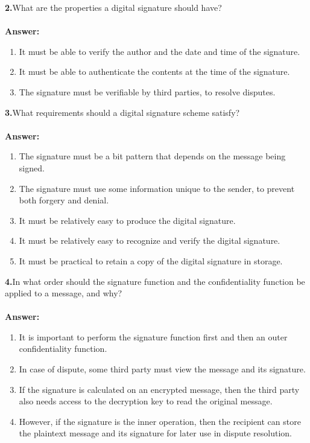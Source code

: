 \documentclass[paper=a4, fontsize=11pt]{scrartcl} %
\numberwithin{equation}{section} %
\numberwithin{figure}{section} %
\numberwithin{table}{section} %
\begin{document}
\textbf{2.}What are the properties a digital signature should have?
\\
\\
\textbf{Answer:}
\begin{enumerate}
\item It must be able to verify the author and the date and time of the signature.
\item It must be able to authenticate the contents at the time of the signature.
\item The signature must be verifiable by third parties, to resolve disputes.
\end{enumerate}

\textbf{3.}What requirements should a digital signature scheme satisfy?
\\
\\
\textbf{Answer:}
\begin{enumerate}
\item The signature must be a bit pattern that depends on the message being signed.
\item The signature must use some information unique to the sender, to prevent both forgery and denial.
\item It must be relatively easy to produce the digital signature.
\item It must be relatively easy to recognize and verify the digital signature.
\item It must be practical to retain a copy of the digital signature in storage.
\end{enumerate}

\textbf{4.}In what order should the signature function and the confidentiality function be applied to a message, and why?
\\
\\
\textbf{Answer:}
\begin{enumerate}
\item It is important to perform the signature function first and then an outer confidentiality function.
\item In case of dispute, some third party must view the message and its signature.
\item If the signature is calculated on an encrypted message, then the third party also needs access to the decryption key to read the original message.
\item However, if the signature is the inner operation, then the recipient can store the plaintext message and its signature for later use in dispute resolution.
\end{enumerate}
\end{document}

